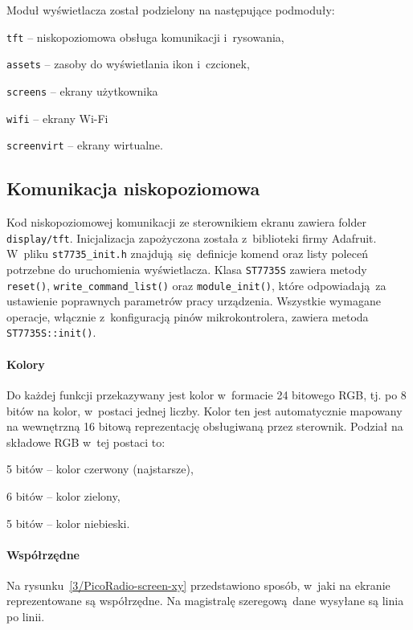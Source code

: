 \documentclass[polish]{aghengthesis}
\let\tempone\itemize
\let\temptwo\enditemize
\renewenvironment{itemize}{\tempone\setlength{\itemsep}{0cm}}{\temptwo}
\begin{document}
		\noindent
		Moduł wyświetlacza został podzielony na następujące podmoduły:
		\begin{itemize}
			\item \lstinline|tft| -- niskopoziomowa obsługa komunikacji i~rysowania,
			\item \lstinline|assets| -- zasoby do wyświetlania ikon i~czcionek,
			\item \lstinline|screens| -- ekrany użytkownika
			\begin{itemize}
				\item \lstinline|wifi| -- ekrany Wi-Fi
			\end{itemize}
			\item \lstinline|screenvirt| -- ekrany wirtualne.
		\end{itemize}
		
		\subsection{Komunikacja niskopoziomowa}
			Kod niskopoziomowej komunikacji ze sterownikiem ekranu zawiera folder \lstinline|display/tft|. Inicjalizacja zapożyczona została z~biblioteki firmy Adafruit. W~pliku \lstinline|st7735_init.h| znajdują się definicje komend oraz listy poleceń potrzebne do uruchomienia wyświetlacza. Klasa \lstinline|ST7735S| zawiera metody \lstinline|reset()|, \lstinline|write_command_list()| oraz \lstinline|module_init()|, które odpowiadają za ustawienie poprawnych parametrów pracy urządzenia. Wszystkie wymagane operacje, włącznie z~konfiguracją pinów mikrokontrolera, zawiera metoda \lstinline|ST7735S::init()|.
			
		\paragraph{Kolory}
			Do każdej funkcji przekazywany jest kolor w~formacie 24 bitowego RGB, tj. po 8 bitów na kolor, w~postaci jednej liczby. Kolor ten jest automatycznie mapowany na wewnętrzną 16 bitową reprezentację obsługiwaną przez sterownik. Podział na składowe RGB w~tej postaci to:
			\begin{itemize}
				\item 5 bitów -- kolor czerwony (najstarsze),
				\item 6 bitów -- kolor zielony,
				\item 5 bitów -- kolor niebieski.
			\end{itemize}
		
		\paragraph{Współrzędne}
			Na rysunku~\ref{3/PicoRadio-screen-xy} przedstawiono sposób, w~jaki na ekranie reprezentowane są współrzędne. Na magistralę szeregową dane wysyłane są linia po linii.
			
\end{document}
